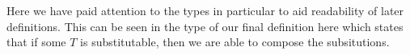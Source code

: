 \begin{code}%
\>[0]\AgdaSpace{}%
\AgdaSymbol{:}\AgdaSpace{}%
\AgdaSpace{}%
\AgdaSpace{}%
\AgdaSpace{}%
\AgdaSpace{}%
\AgdaOperator{\AgdaFunction{\AgdaUnderscore{}⇒[}}\AgdaSpace{}%
\AgdaSpace{}%
\AgdaOperator{\AgdaFunction{]\AgdaUnderscore{}}}\<%
\\
\>[0]\AgdaOperator{\AgdaFunction{[}}\AgdaSpace{}%
\AgdaBound{/}\AgdaSpace{}%
\AgdaOperator{\AgdaFunction{]}}%
\>[7]%
\>[15]\AgdaSpace{}%
\AgdaSpace{}%
\AgdaSymbol{=}\AgdaSpace{}%
\<%
\\
\>[0]\AgdaOperator{\AgdaFunction{[}}\AgdaSpace{}%
\AgdaBound{/}\AgdaSpace{}%
\AgdaOperator{\AgdaFunction{]}}\AgdaSpace{}%
\AgdaSymbol{(}\AgdaSpace{}%
\AgdaOperator{\AgdaInductiveConstructor{-,}}\AgdaSpace{}%
\AgdaSymbol{)}\AgdaSpace{}%
\AgdaSpace{}%
\AgdaSpace{}%
\AgdaSymbol{=}\AgdaSpace{}%
\AgdaSymbol{(}\AgdaOperator{\AgdaFunction{[}}\AgdaSpace{}%
\AgdaBound{/}\AgdaSpace{}%
\AgdaOperator{\AgdaFunction{]}}\AgdaSpace{}%
\AgdaSpace{}%
\AgdaSpace{}%
\AgdaSymbol{)}\AgdaSpace{}%
\AgdaOperator{\AgdaInductiveConstructor{-,}}\AgdaSpace{}%
\AgdaBound{/}\AgdaSpace{}%
\AgdaSpace{}%
\<%
\end{code}
Here we have paid attention to the types in particular to aid readability of
later definitions. This can be seen in the type of our final definition here
which states that if some $T$ is substitutable, then we are able to compose
the subsitutions.

